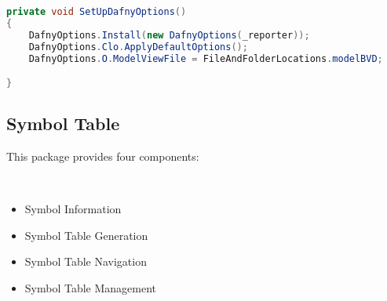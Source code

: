 


\begin{lstlisting}[language=csharp, caption={Setting up Dafny Options}, captionpos=b, label={lst:setupdafnyoptions}]
private void SetUpDafnyOptions()
{
    DafnyOptions.Install(new DafnyOptions(_reporter));
    DafnyOptions.Clo.ApplyDefaultOptions();
    DafnyOptions.O.ModelViewFile = FileAndFolderLocations.modelBVD;

}
\end{lstlisting}


\subsection{Symbol Table}
This package provides four components:

\\

\begin{itemize}
    \item Symbol Information
    \item Symbol Table Generation
    \item Symbol Table Navigation
    \item Symbol Table Management
\end{itemize}

